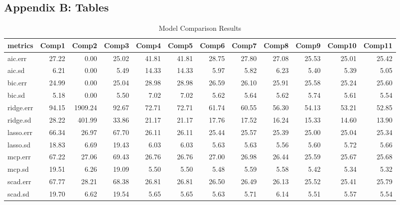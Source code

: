 \documentclass[11pt a4paper]{article}
\begin{document}
	
	
	\subsection*{Appendix B: Tables}
	
	
	\begin{table}[H]
		\centering
		\caption{Model Comparison Results}
		\begin{tabular}{|l|r|r|r|r|r|r|r|r|r|r|r|}
			\hline
			metrics   & Comp1  & Comp2   & Comp3  & Comp4  & Comp5  & Comp6  & Comp7  & Comp8  & Comp9  & Comp10 & Comp11 \\ \hline
			aic.err   & 27.22  & 0.00    & 25.02  & 41.81  & 41.81  & 28.75  & 27.80  & 27.08  & 25.53  & 25.01  & 25.42  \\ \hline
			aic.sd    & 6.21   & 0.00    & 5.49   & 14.33  & 14.33  & 5.97   & 5.82   & 6.23   & 5.40   & 5.39   & 5.05   \\ \hline
			bic.err   & 24.99  & 0.00    & 25.04  & 28.98  & 28.98  & 26.59  & 26.10  & 25.91  & 25.58  & 25.24  & 25.60  \\ \hline
			bic.sd    & 5.18   & 0.00    & 5.50   & 7.02   & 7.02   & 5.62   & 5.64   & 5.62   & 5.74   & 5.61   & 5.54   \\ \hline
			ridge.err & 94.15  & 1909.24 & 92.67  & 72.71  & 72.71  & 61.74  & 60.55  & 56.30  & 54.13  & 53.21  & 52.85  \\ \hline
			ridge.sd  & 28.22  & 401.99  & 33.86  & 21.17  & 21.17  & 17.76  & 17.52  & 16.24  & 15.33  & 14.60  & 13.90  \\ \hline
			lasso.err & 66.34  & 26.97   & 67.70  & 26.11  & 26.11  & 25.44  & 25.57  & 25.39  & 25.00  & 25.04  & 25.34  \\ \hline
			lasso.sd  & 18.83  & 6.69    & 19.43  & 6.03   & 6.03   & 5.63   & 5.63   & 5.56   & 5.60   & 5.72   & 5.66   \\ \hline
			mcp.err   & 67.22  & 27.06   & 69.43  & 26.76  & 26.76  & 27.00  & 26.98  & 26.44  & 25.59  & 25.67  & 25.68  \\ \hline
			mcp.sd    & 19.51  & 6.26    & 19.09  & 5.50   & 5.50   & 5.48   & 5.59   & 5.58   & 5.42   & 5.34   & 5.32   \\ \hline
			scad.err  & 67.77  & 28.21   & 68.38  & 26.81  & 26.81  & 26.50  & 26.49  & 26.13  & 25.52  & 25.41  & 25.79  \\ \hline
			scad.sd   & 19.70  & 6.62    & 19.54  & 5.65   & 5.65   & 5.63   & 5.71   & 6.14   & 5.51   & 5.57   & 5.54   \\ \hline

\end{tabular}
\end{table}
\end{document}
